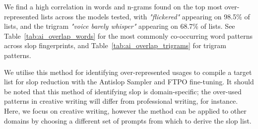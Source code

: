 \documentclass[11pt]{article}
\begin{document}
We find a high correlation in words and n-grams found on the top most over-represented lists across the models tested, with \textit{"flickered"} appearing on 98.5\% of lists, and the trigram \textit{"voice barely whisper"} appearing on 68.7\% of lists. See Table~\ref{tab:ai_overlap_words} for the most commonly co-occurring word patterns across slop fingerprints, and Table~\ref{tab:ai_overlap_trigrams} for trigram patterns.

We utilise this method for identifying over-represented usages to compile a target list for slop reduction with the Antislop Sampler and FTPO fine-tuning. It should be noted that this method of identifying slop is domain-specific; the over-used patterns in creative writing will differ from professional writing, for instance. Here, we focus on creative writing, however the method can be applied to other domains by choosing a different set of prompts from which to derive the slop list.
\end{document}

